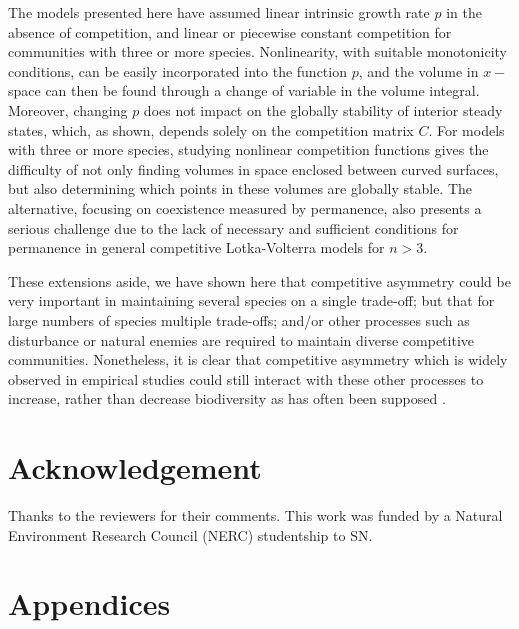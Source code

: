 The models presented here have assumed linear intrinsic growth rate $p$ in the absence of competition, and linear or piecewise constant competition for communities with three or more species. Nonlinearity, with suitable monotonicity conditions, can be easily incorporated into the function $p$, and the volume in $x-$space can then be found through a change of variable in the volume integral. Moreover, changing $p$ does not impact on the globally stability of interior steady states, which, as shown, depends solely on the competition matrix $C$. For models with three or more species, studying nonlinear competition functions gives the difficulty of not only finding volumes in space enclosed between curved surfaces, but also determining which points in these volumes are globally stable. The alternative, focusing on coexistence measured by permanence, also presents a serious challenge due to the lack of necessary and sufficient conditions for permanence in general competitive Lotka-Volterra models for $n>3$.

These extensions aside, we have shown here that competitive asymmetry could be very important in maintaining several species on a single trade-off; but that for large numbers of species multiple trade-offs; and/or other processes such as disturbance or natural enemies are required to maintain diverse competitive communities. Nonetheless, it is clear that competitive asymmetry which is widely observed in empirical studies could still interact with these other processes to increase, rather than decrease biodiversity as has often been supposed \citep[e.g.][]{keddy1997experimental, resetarits1995competitive}.

\section*{Acknowledgement}

Thanks to the reviewers for their comments. This work was funded by a Natural Environment Research Council (NERC) studentship to SN.

\section*{Appendices}
\bappendix
